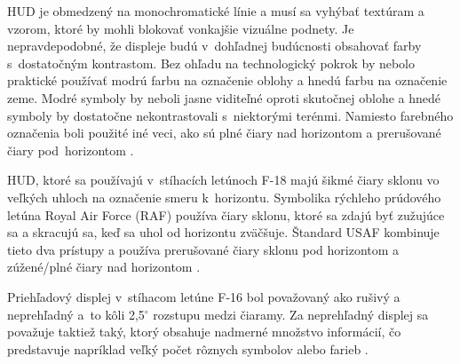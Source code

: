 HUD je obmedzený na monochromatické línie a musí sa vyhýbať textúram a vzorom, ktoré by mohli blokovať vonkajšie vizuálne podnety. Je nepravdepodobné, že displeje budú v~dohľadnej budúcnosti obsahovať farby s~dostatočným kontrastom. Bez ohľadu na technologický pokrok by nebolo praktické používať modrú farbu na označenie oblohy a hnedú farbu na označenie zeme. Modré symboly by neboli jasne viditeľné oproti skutočnej oblohe a hnedé symboly by dostatočne nekontrastovali s~niektorými terénmi. Namiesto farebného označenia boli použité iné veci, ako sú plné čiary nad horizontom a prerušované čiary pod~horizontom \cite{HUDkniha}.

HUD, ktoré sa používajú v~stíhacích letúnoch F-18 majú šikmé čiary sklonu vo veľkých uhloch na označenie smeru k~horizontu. Symbolika rýchleho prúdového letúna Royal Air Force (RAF) používa čiary sklonu, ktoré sa zdajú byť zužujúce sa a skracujú sa, keď sa uhol od horizontu zväčšuje. Štandard USAF kombinuje tieto dva prístupy a používa prerušované čiary sklonu pod horizontom a zúžené/plné čiary nad horizontom \cite{HUDkniha}.

Priehľadový displej v~stíhacom letúne F-16 bol považovaný ako rušivý a neprehľadný a~to kôli 2,5$^\circ$ rozstupu medzi čiaramy. Za neprehľadný displej sa považuje taktiež taký, ktorý obsahuje nadmerné množstvo informácií, čo predstavuje napríklad veľký počet rôznych symbolov alebo farieb \cite{HUDkniha}.


